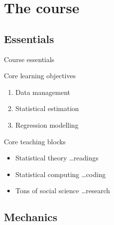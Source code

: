 \documentclass[t]{beamer}
\begin{document}
  \section{The course}
	
  \subsection{Essentials}
  
  \begin{frame}[t]{Course essentials}

    \begin{block}{Core learning objectives}
      \begin{enumerate}
        \item Data management
        \item Statistical estimation
        \item Regression modelling
      \end{enumerate} 
    \end{block}
  
    \begin{block}{Core teaching blocks}
      \begin{itemize}
        \item Statistical theory      \hfill …readings
        \item Statistical computing   \hfill …coding
        \item Tons of social science  \hfill …research
      \end{itemize}   
    \end{block}
    
  \end{frame}

  \subsection{Mechanics}
	
\end{document}
